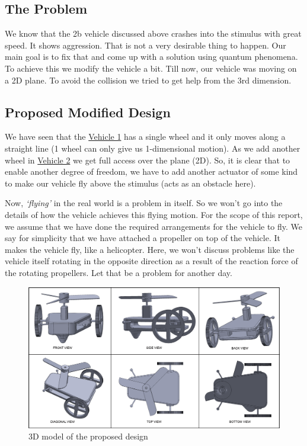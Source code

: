 \documentclass[main.tex]{subfiles}
\begin{document}
    
    \subsection{The Problem}
    We know that the 2b vehicle discussed above crashes into the stimulus with great speed. It shows aggression. That is not a very desirable thing to happen. Our main goal is to fix that and come up with a solution using quantum phenomena. To achieve this we modify the vehicle a bit. Till now, our vehicle was moving on a 2D plane. To avoid the collision we tried to get help from the 3rd dimension.
    
    \subsection{Proposed Modified Design}
    We have seen that the \hyperref[sec:Vehicle_1]{Vehicle 1} has a single wheel and it only moves along a straight line (1 wheel can only give us 1-dimensional motion). As we add another wheel in \hyperref[sec:Vehicle_2]{Vehicle 2} we get full access over the plane (2D). So, it is clear that to enable another degree of freedom, we have to add another actuator of some kind to make our vehicle fly above the stimulus (acts as an obstacle here).

    Now, \textit{`flying'} in the real world is a problem in itself. So we won't go into the details of how the vehicle achieves this flying motion. For the scope of this report, we assume that we have done the required arrangements for the vehicle to fly. We say for simplicity that we have attached a propeller on top of the vehicle. It makes the vehicle fly, like a helicopter. Here, we won't discuss problems like the vehicle itself rotating in the opposite direction as a result of the reaction force of the rotating propellers. Let that be a problem for another day.

        \begin{figure}[t]%
            \centering
            \includegraphics[width=13cm]{./images/vehicle_3D_grouped.png} 
            \caption{3D model of the proposed design}%
            \label{fig:3D_design}%
        \end{figure}
\end{document}

